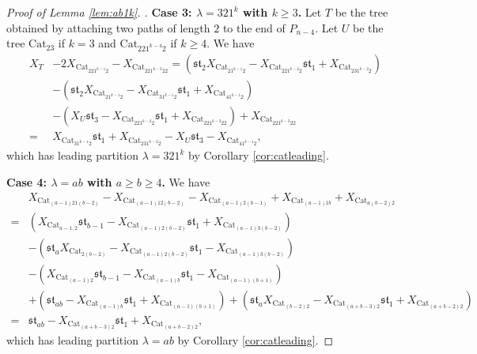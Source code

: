 \documentclass[12pt]{amsart}  %
\theoremstyle{definition}
\theoremstyle{remark}
\numberwithin{equation}{section}
\begin{document}
\begin{proof}[Proof of Lemma \ref{lem:ab1k}. ]
\textbf{Case 3: $\lambda=321^k$ with $k\geq 3$. } Let $T$ be the tree obtained by attaching two paths of length $2$ to the end of $P_{n-4}$. Let $U$ be the tree $\text{Cat}_{23}$ if $k=3$ and $\text{Cat}_{221^{k-4}2}$ if $k\geq 4$. We have
\begin{align*}
X_T&-2X_{\text{Cat}_{221^{k-1}2}}-X_{\text{Cat}_{221^{k-3}22}}=(\mathfrak{st}_2X_{\text{Cat}_{21^{k-1}2}}-X_{\text{Cat}_{221^{k-2}2}}\mathfrak{st}_1+X_{\text{Cat}_{231^{k-2}2}})\\&-(\mathfrak{st}_2X_{\text{Cat}_{21^{k-1}2}}-X_{\text{Cat}_{31^{k-1}2}}\mathfrak{st}_1+X_{\text{Cat}_{41^{k-1}2}})\\&-(X_U\mathfrak{st}_3-X_{\text{Cat}_{221^{k-2}2}}\mathfrak{st}_1+X_{\text{Cat}_{221^{k-3}22}})+X_{\text{Cat}_{221^{k-3}22}}\\=&X_{\text{Cat}_{31^{k-1}2}}\mathfrak{st}_1+X_{\text{Cat}_{231^{k-2}2}}-X_U\mathfrak{st}_3-X_{\text{Cat}_{41^{k-1}2}},
\end{align*}
which has leading partition $\lambda=321^k$ by Corollary \ref{cor:catleading}.

\textbf{Case 4: $\lambda=ab$ with $a\geq b\geq 4$. }We have
\begin{align*}
&X_{\text{Cat}_{(a-1)21(b-2)}}-X_{\text{Cat}_{(a-1)12(b-2)}}-X_{\text{Cat}_{(a-1)2(b-1)}}+X_{\text{Cat}_{(a-1)1b}}+X_{\text{Cat}_{a(b-2)2}}\\=&(X_{\text{Cat}_{a-1,2}}\mathfrak{st}_{b-1}-X_{\text{Cat}_{(a-1)2(b-2)}}\mathfrak{st}_1+X_{\text{Cat}_{(a-1)3(b-2)}})\\&-(\mathfrak{st}_aX_{\text{Cat}_{2(b-2)}}-X_{\text{Cat}_{(a-1)2(b-2)}}\mathfrak{st}_1-X_{\text{Cat}_{(a-1)3(b-2)}})\\&-(X_{\text{Cat}_{(a-1)2}}\mathfrak{st}_{b-1}-X_{\text{Cat}_{(a-1)b}}\mathfrak{st}_1-X_{\text{Cat}_{(a-1)(b+1)}})\\&+(\mathfrak{st}_{ab}-X_{\text{Cat}_{(a-1)b}}\mathfrak{st}_1+X_{\text{Cat}_{(a-1)(b+1)}})+(\mathfrak{st}_aX_{\text{Cat}_{(b-2)2}}-X_{\text{Cat}_{(a+b-3)2}}\mathfrak{st}_1+X_{\text{Cat}_{(a+b-2)2}})\\=&\mathfrak{st}_{ab}-X_{\text{Cat}_{(a+b-3)2}}\mathfrak{st}_1+X_{\text{Cat}_{(a+b-2)2}},
\end{align*}
which has leading partition $\lambda=ab$ by Corollary \ref{cor:catleading}.


\end{proof}
\end{document}
